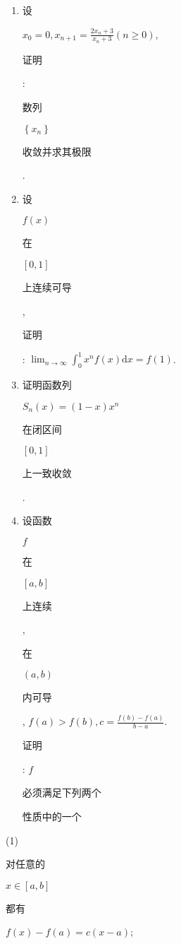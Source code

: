 \documentclass[10pt]{article}
\begin{document}
\begin{enumerate}
  \item \begin{CJK}{UTF8}{mj}设\end{CJK} $x_{0}=0, x_{n+1}=\frac{2 x_{n}+3}{x_{n}+3}(n \geqslant 0)$, \begin{CJK}{UTF8}{mj}证明\end{CJK}: \begin{CJK}{UTF8}{mj}数列\end{CJK} $\left\{x_{n}\right\}$ \begin{CJK}{UTF8}{mj}收敛并求其极限\end{CJK}.

  \item \begin{CJK}{UTF8}{mj}设\end{CJK} $f(x)$ \begin{CJK}{UTF8}{mj}在\end{CJK} $[0,1]$ \begin{CJK}{UTF8}{mj}上连续可导\end{CJK}, \begin{CJK}{UTF8}{mj}证明\end{CJK}: $\lim _{n \rightarrow \infty} \int_{0}^{1} x^{n} f(x) \mathrm{d} x=f(1)$.

  \item \begin{CJK}{UTF8}{mj}证明函数列\end{CJK} $S_{n}(x)=(1-x) x^{n}$ \begin{CJK}{UTF8}{mj}在闭区间\end{CJK} $[0,1]$ \begin{CJK}{UTF8}{mj}上一致收敛\end{CJK}.

  \item \begin{CJK}{UTF8}{mj}设函数\end{CJK} $f$ \begin{CJK}{UTF8}{mj}在\end{CJK} $[a, b]$ \begin{CJK}{UTF8}{mj}上连续\end{CJK}, \begin{CJK}{UTF8}{mj}在\end{CJK} $(a, b)$ \begin{CJK}{UTF8}{mj}内可导\end{CJK}, $f(a)>f(b), c=\frac{f(b)-f(a)}{b-a}$. \begin{CJK}{UTF8}{mj}证明\end{CJK}: $f$ \begin{CJK}{UTF8}{mj}必须满足下列两个\end{CJK} \begin{CJK}{UTF8}{mj}性质中的一个\end{CJK}

\end{enumerate}
(1) \begin{CJK}{UTF8}{mj}对任意的\end{CJK} $x \in[a, b]$ \begin{CJK}{UTF8}{mj}都有\end{CJK} $f(x)-f(a)=c(x-a)$;
\end{document}

